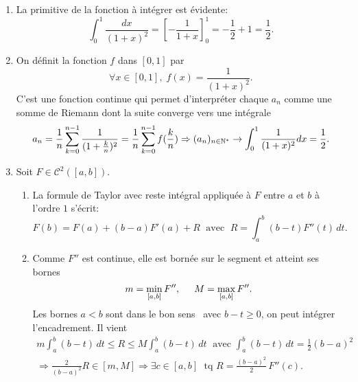 \begin{enumerate}
\item La primitive de la fonction à intégrer est évidente:
\[
 \int_{0}^{1}\frac{dx}{(1+x)^2} = \left[ -\frac{1}{1 + x}\right]_{0}^{1} = -\frac{1}{2} + 1  = \frac{1}{2}. 
\]


\item  On d{\'e}finit la fonction $f$ dans $\left[ 0,1\right]$ par 
\[
 \forall x \in \left[ 0,1\right], \; f(x)=\frac{1}{(1+x)^{2}}.
\]
C'est une fonction continue qui permet d'interpr{\'e}ter chaque $a_{n}$ comme une somme de Riemann dont la suite converge vers une intégrale
\[
a_{n} = \frac{1}{n}\sum_{k = 0}^{n - 1}\frac{1}{(1+\frac{k}{n})^{2}}
 = \frac{1}{n}\sum_{k = 0}^{n - 1}f(\frac{k}{n})
\Rightarrow 
(a_{n})_{n\in \mathbb{N}^*} \rightarrow \int_{0}^{1}\frac{1}{(1+x)^{2}}dx = \frac{1}{2}.
\]

\item Soit $F \in \mathcal{C}^2(\left[ a,b\right])$.  
\begin{enumerate}
 \item La formule de Taylor avec reste intégral appliquée à $F$ entre $a$ et $b$ à l'ordre $1$ s'écrit:
\[
 F(b) = F(a) + (b-a)F'(a) + R \; \text{ avec }\; R = \int_{a}^{b}(b-t)F''(t)\,dt .
\]

 \item Comme $F''$ est continue, elle est bornée sur le segment et atteint ses bornes 
\[
 m = \min_{\left[ a,b\right]} F'', \hspace{0.5cm} M = \max_{\left[ a,b\right]} F''.
\]
Les bornes $a < b$ sont \og dans le bon sens\fg~ avec $b - t \geq 0$, on peut intégrer l'encadrement. Il vient
\begin{multline*}
 m \int_a^b(b-t)\,dt \leq R \leq M \int_a^b(b-t)\,dt \; \text{ avec } \int_a^b(b-t)\,dt = \frac{1}{2}(b-a)^2 \\
 \Rightarrow \frac{2}{(b-a)^2} R \in \left[ m,M\right] 
 \Rightarrow \exists c \in \left[ a,b\right]\; \text{ tq } R = \frac{(b-a)^2}{2}\,F''(c). 
\end{multline*}

\end{enumerate}


\end{enumerate}
